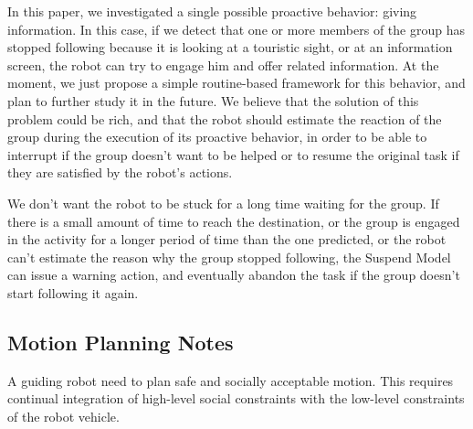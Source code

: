 In this paper, we investigated a single possible proactive behavior: giving information. In this case, if we detect that one or more  members
of the group has stopped following because it is looking at a touristic sight, or at an information screen, the robot can try to engage him and offer related information. At the moment, we just propose a simple routine-based framework for this behavior, and plan to further study it in the future. We believe that the solution of this problem could be rich, and that the robot should estimate the reaction of the group during the execution of its proactive behavior, in order to be able to interrupt if the group doesn't want to be helped or to resume the original task if they are satisfied by the robot's actions.

We don't want the robot to be stuck for a long time  waiting for the group. If there is a small amount of time to reach the destination, or the group is engaged in the activity for a longer period of time than the one predicted, or the robot can't estimate the reason why the group stopped following, the Suspend Model can issue a warning action, and eventually abandon the task if the group doesn't start following it again.


\vspace{-5pt}

\subsection{Motion Planning Notes}

A guiding robot need to plan safe and socially acceptable motion. This requires continual integration of high-level social constraints with the low-level constraints of the robot vehicle.

